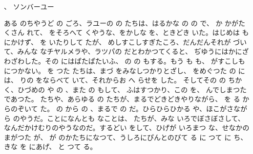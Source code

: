\documentclass[a4paper,
tate,
book]
{jlreq}
\begin{document}
             、  ソンバーユー

  ある のちやうど の ごろ、ラユーの の たちは、はるかな の の で、 か かがたくさん れて、 をそろへて くやうな、をかしな を、ときどき いた。はじめは も にかけず、 を いたりして たが、 めしすこしすぎたころ、だんだんそれが づいて、みんな なチヤルメラや、ラツパの だとわかつてくると、 ぢゆうにはかにざわざわした。その にはぱたぱたいふ、 の の もする。もう も も、 がすこしも につかない。 を つた たちは、まづ をみなしつかりとざし、 をめぐつた の には、 りの をならべて いて、それからお へ らせを した。
  そしてその の ちかく、ひづめの や の 、また の もして、 ふはすつかり、この を、 んでしまつた であつた。
   たちや、あらゆる の たちが、まるでどきどきやりながら、 を る からのぞいて た。 の から の 、まるで の だ。ひらひらひかる や、ほこがさながら のやうだ。ことになんとも なことは、 たちが、みな いろでぼさぼさして、なんだかけむりのやうなのだ。するどい をして、ひげが いろまつ な、せなかのまがつた が、 が のかたちになつて、うしろにぴんとのびて る に つて に ち、 きな を にあげ、  と つて る。
\end{document}
